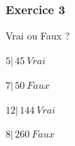 \documentclass{article}
\begin{document}
\subsubsection{Exercice 3}

Vrai ou Faux ? \\
\\
$5 \mathbin{\left|\,\right.} 45 \ Vrai$ \\ \\
$7 \mathbin{\left|\,\right.} 50 \ Faux$ \\ \\
$12 \mathbin{\left|\,\right.} 144 \ Vrai$ \\ \\
$8 \mathbin{\left|\,\right.} 260 \ Faux$ \\ \\
\end{document}
